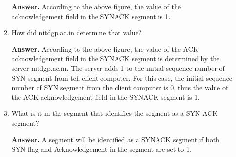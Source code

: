 \documentclass{article}
\begin{document}
\begin{enumerate}
\begin{enumerate}
\textbf{Answer.} According to the above figure, the value of the acknowledgement field in the SYNACK segment is 1.

\item How did nitdgp.ac.in determine that value?

\textbf{Answer.} According to the above figure, the value of the ACK acknowledgement field in the SYNACK segment is determined by the server nitdgp.ac.in. The server adds 1 to the initial sequence number of SYN segment from teh client computer. For this case, the initial sequence number of SYN segment from the client computer is 0, thus the value of the ACK acknowledgement field in the SYNACK segment is 1.

\item What is it in the segment that identifies the segment as a SYN-ACK segment?

\textbf{Answer.} A segment will be identified as a SYNACK segment if both SYN flag and Acknowledgement in the segment are set to 1.

\end{enumerate}
\end{enumerate}
\end{document}

